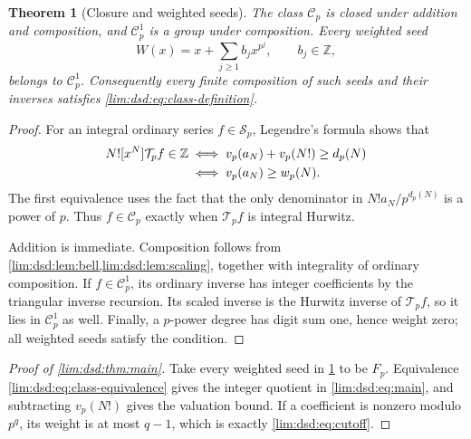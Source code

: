 \documentclass[11pt]{article}
\newtheorem{theorem}{Theorem}[section]
\theoremstyle{definition}
\theoremstyle{remark}
\newcommand{\Z}{\mathbb Z}
\newcommand{\Cp}{\mathcal C_p}
\newcommand{\Tp}{\mathcal T_p}
\begin{document}
\begin{theorem}[Closure and weighted seeds]
\label{lim:dsd:thm:class}
The class $\Cp$ is closed under addition and composition, and $\Cp^1$
is a group under composition. Every weighted seed
\begin{equation}
 W(x)=x+\sum_{j\ge1}b_jx^{p^j},\qquad b_j\in\Z,
 \label{lim:dsd:eq:weighted-seed}
\end{equation}
belongs to $\Cp^1$. Consequently every finite composition of such
seeds and their inverses satisfies \eqref{lim:dsd:eq:class-definition}.
\end{theorem}
\begin{proof}
For an integral ordinary series $f\in\mathscr S_p$, Legendre's formula
shows that
\begin{align}
 N![x^N]\Tp f\in\Z
 &\iff v_p(a_N)+v_p(N!)\ge d_p(N)\notag\\
 &\iff v_p(a_N)\ge w_p(N).
 \label{lim:dsd:eq:class-equivalence}
\end{align}
The first equivalence uses the fact that the only denominator in
$N!a_N/p^{d_p(N)}$ is a power of $p$. Thus $f\in\Cp$ exactly when
$\Tp f$ is integral Hurwitz.

Addition is immediate. Composition follows from
\cref{lim:dsd:lem:bell,lim:dsd:lem:scaling}, together with integrality of ordinary
composition. If $f\in\Cp^1$, its ordinary inverse has integer
coefficients by the triangular inverse recursion. Its scaled inverse
is the Hurwitz inverse of $\Tp f$, so it lies in $\Cp^1$ as well.
Finally, a $p$-power degree has digit sum one, hence weight zero;
all weighted seeds satisfy the condition.
\end{proof}

\begin{proof}[Proof of \cref{lim:dsd:thm:main}]
Take every weighted seed in \cref{lim:dsd:thm:class} to be $F_p$.
Equivalence \eqref{lim:dsd:eq:class-equivalence} gives the integer quotient
in \eqref{lim:dsd:eq:main}, and subtracting $v_p(N!)$ gives the valuation bound.
If a coefficient is nonzero modulo $p^q$, its weight is at most $q-1$,
which is exactly \eqref{lim:dsd:eq:cutoff}.
\end{proof}
\end{document}
